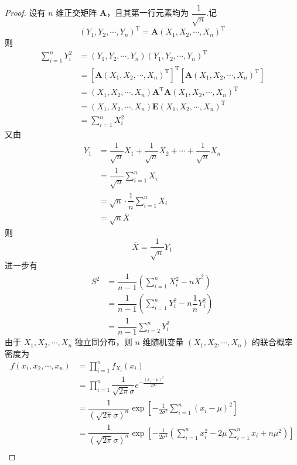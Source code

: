 \begin{proof}
    设有 $n$ 维正交矩阵 $\boldsymbol{A}$，且其第一行元素均为 $\dfrac{1}{\sqrt{n}}$.记
    $$
    (Y_1, Y_2, \cdots, Y_n)^{\text{T}} = \boldsymbol{A} (X_1, X_2, \cdots, X_n)^{\text{T}}
    $$
    则
    $$
    \begin{aligned}
        \sum_{i=1}^n Y_i^2 &= (Y_1, Y_2, \cdots, Y_n) (Y_1, Y_2, \cdots, Y_n)^{\text{T}} \\
        &= [\boldsymbol{A} (X_1, X_2, \cdots, X_n)^{\text{T}}]^{\text{T}} [\boldsymbol{A} (X_1, X_2, \cdots, X_n)^{\text{T}}] \\
        &= (X_1, X_2, \cdots, X_n) \boldsymbol{A}^{\text{T}} \boldsymbol{A} (X_1, X_2, \cdots, X_n)^{\text{T}} \\
        &= (X_1, X_2, \cdots, X_n) \boldsymbol{E} (X_1, X_2, \cdots, X_n)^{\text{T}} \\
        &= \sum_{i=1}^n X_i^2
    \end{aligned}
    $$
    又由
    $$
    \begin{aligned}
        Y_1 &= \dfrac{1}{\sqrt{n}} X_1 + \dfrac{1}{\sqrt{n}} X_2 + \cdots + \dfrac{1}{\sqrt{n}} X_n \\
        &= \dfrac{1}{\sqrt{n}} \sum_{i=1}^{n} X_i \\
        &= \sqrt{n} \cdot \dfrac{1}{n} \sum_{i=1}^{n} X_i \\
        &= \sqrt{n} \overline{X}
    \end{aligned}
    $$
    则
    $$
    \overline{X} = \dfrac{1}{\sqrt{n}} Y_1
    $$
    进一步有
    $$
    \begin{aligned}
        S^2 &= \dfrac{1}{n-1} \left( \sum_{i=1}^n X_i^2 - n \overline{X}^2 \right) \\
        &= \dfrac{1}{n-1} \left( \sum_{i=1}^n Y_i^2 - n \dfrac{1}{n} Y_1^2 \right) \\
        &= \dfrac{1}{n-1} \sum_{i=2}^n Y_i^2
    \end{aligned}
    $$
    由于 $X_1,X_2,\cdots,X_n$ 独立同分布，则 $n$ 维随机变量 $(X_1, X_2, \cdots, X_n)$ 的联合概率密度为
    $$
    \begin{aligned}
        f(x_1, x_2, \cdots, x_n) &= \prod_{i=1}^n f_{X_i}(x_i) \\
        &= \prod_{i=1}^n \dfrac{1}{\sqrt{2 \pi} \sigma} e^{-\frac{(x_i - \mu)^2}{2 \sigma^2}} \\
        &= \dfrac{1}{(\sqrt{2 \pi} \sigma)^n} \exp{ \left[-\frac{1}{2 \sigma^2} \sum_{i=1}^{n} (x_i - \mu)^2 \right] } \\
        &= \dfrac{1}{(\sqrt{2 \pi} \sigma)^n} \exp{ \left[-\frac{1}{2 \sigma^2} \left( \sum_{i=1}^{n} x_i^2 - 2 \mu \sum_{i=1}^{n} x_i + n \mu^2 \right) \right] } \\

\end{aligned}$$
\end{proof}
